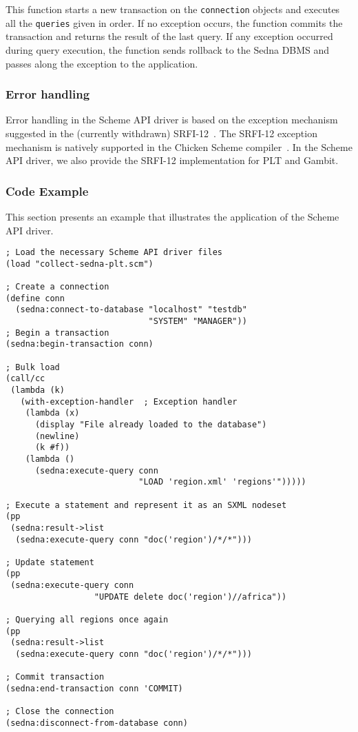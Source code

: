 \documentclass[a4paper,12pt]{article}
\begin{document}
This function starts a new transaction on the \texttt{connection} objects and
executes all the \texttt{queries} given in order. If no exception occurs, the
function commits the transaction and returns the result of the last query. If
any exception occurred during query execution, the function sends rollback to
the Sedna DBMS and passes along the exception to the application.


\subsubsection{Error handling}
\label{scheme-errors}

Error handling in the Scheme API driver is based on the exception mechanism
suggested in the (currently withdrawn) SRFI-12~\cite{paper:srfi-12}. The SRFI-12
exception mechanism is natively supported in the Chicken Scheme
compiler~\cite{paper:chicken}. In the Scheme API driver, we also provide the
SRFI-12 implementation for PLT and Gambit.

\subsubsection{Code Example}

This section presents an example that illustrates the application of the Scheme
API driver.

\small{
\begin{verbatim}
; Load the necessary Scheme API driver files
(load "collect-sedna-plt.scm")

; Create a connection
(define conn
  (sedna:connect-to-database "localhost" "testdb"
                             "SYSTEM" "MANAGER"))
; Begin a transaction
(sedna:begin-transaction conn)

; Bulk load
(call/cc
 (lambda (k)
   (with-exception-handler  ; Exception handler
    (lambda (x)
      (display "File already loaded to the database")
      (newline)
      (k #f))
    (lambda ()
      (sedna:execute-query conn
                           "LOAD 'region.xml' 'regions'")))))

; Execute a statement and represent it as an SXML nodeset
(pp
 (sedna:result->list
  (sedna:execute-query conn "doc('region')/*/*")))

; Update statement
(pp
 (sedna:execute-query conn
                  "UPDATE delete doc('region')//africa"))

; Querying all regions once again
(pp
 (sedna:result->list
  (sedna:execute-query conn "doc('region')/*/*")))

; Commit transaction
(sedna:end-transaction conn 'COMMIT)

; Close the connection
(sedna:disconnect-from-database conn)
\end{verbatim}}
\end{document}
